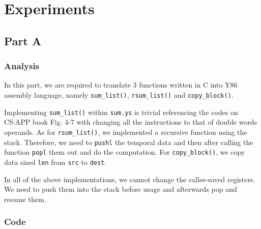 \documentclass{article}
\begin{document}
\section{Experiments}

\subsection{Part A}

\subsubsection{Analysis}
\hspace{1 em}
\par In this part, we are required to translate $3$ functions written in C into Y86 assembly language, namely \lstinline{sum_list()}, \lstinline{rsum_list()} and \lstinline{copy_block()}.
\par Implementing \lstinline{sum_list()} within \lstinline{sum.ys} is trivial referencing the codes on CS:APP book Fig. 4-7 with changing all the instructions to that of double words operands.
As for \lstinline{rsum_list()}, we implemented a recursive function using the stack. Therefore, we need to \lstinline{pushl} the temporal data and then after calling the function \lstinline{popl} them out and do the computation.
For \lstinline{copy_block()}, we copy data sized \lstinline{len} from \lstinline{src} to \lstinline{dest}.
\par In all of the above implementations, we cannot change the callee-saved registers. We need to push them into the stack before usage and afterwards pop and resume them.

\subsubsection{Code}
\end{document}
